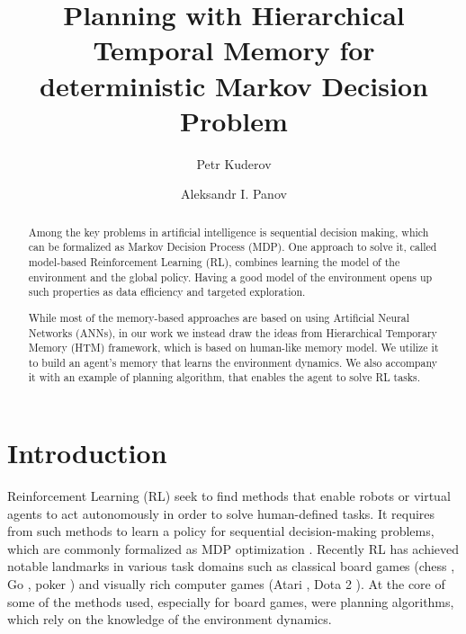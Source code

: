 \documentclass[runningheads]{llncs}
\begin{document}
\title {Planning with Hierarchical Temporal Memory for deterministic Markov Decision Problem}
\author {Petr Kuderov  \and Aleksandr I. Panov }

%

\maketitle

\begin{abstract}
  Among the key problems in artificial intelligence is sequential decision making, which can be formalized as Markov Decision Process (MDP). One approach to solve it, called model-based Reinforcement Learning (RL), combines learning the model of the environment and the global policy. Having a good model of the environment opens up such properties as data efficiency and targeted exploration.
  
  While most of the memory-based approaches are based on using Artificial Neural Networks (ANNs), in our work we instead draw the ideas from Hierarchical Temporary Memory (HTM) framework, which is based on human-like memory model. We utilize it to build an agent's memory that learns the environment dynamics. We also accompany it with an example of planning algorithm, that enables the agent to solve RL tasks.
\end{abstract}


\section{Introduction}

Reinforcement Learning (RL) seek to find methods that enable robots or virtual agents to act autonomously in order to solve human-defined tasks. It requires from such methods to learn a policy for sequential decision-making problems, which are commonly formalized as MDP optimization \cite{Puterman_1994}. Recently RL has achieved notable landmarks in various task domains such as classical board games (chess \cite{Campbell_Hoane_Hsu_2002_DeepBlue}, Go \cite{Silver_Go}, poker \cite{Brown_Sandholm_2017_Poker}) and visually rich computer games (Atari \cite{Mnih_2015_Atari}, Dota 2 \cite{openai_2019_dota}). At the core of some of the methods used, especially for board games, were planning algorithms, which rely on the knowledge of the environment dynamics.
\end{document}
